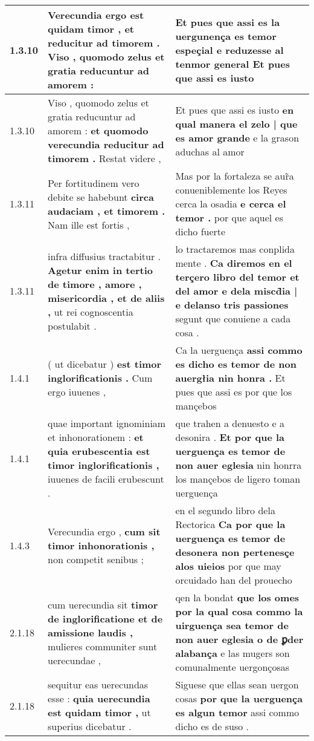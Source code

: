 \begin{tabular}{|p{1cm}|p{6.5cm}|p{6.5cm}|}
1.3.10 & Verecundia ergo est quidam timor , \textbf{ et reducitur ad timorem . } Viso , quomodo zelus et gratia reducuntur ad amorem : & Et pues que assi es la uergunença es temor espeçial \textbf{ e reduzesse al tenmor general } Et pues que assi es iusto \\\hline
1.3.10 & Viso , quomodo zelus et gratia reducuntur ad amorem : \textbf{ et quomodo verecundia reducitur ad timorem . } Restat videre , & Et pues que assi es iusto \textbf{ en qual manera el zelo | que es amor grande } e la grason aduchas al amor \\\hline
1.3.11 & Per fortitudinem vero debite se habebunt \textbf{ circa audaciam , et timorem . } Nam ille est fortis , & Mas por la fortaleza se aur̃a conueniblemente los Reyes cerca la osadia \textbf{ e cerca el temor . } por que aquel es dicho fuerte \\\hline
1.3.11 & infra diffusius tractabitur . \textbf{ Agetur enim in tertio de timore , amore , misericordia , et de aliis , } ut rei cognoscentia postulabit . & lo tractaremos mas conplida mente . \textbf{ Ca diremos en el terçero libro del temor et del amor e dela miscd̃ia | e delanso tris passiones } segunt que conuiene a cada cosa . \\\hline
1.4.1 & ( ut dicebatur ) \textbf{ est timor inglorificationis . } Cum ergo iuuenes , & Ca la uerguença \textbf{ assi commo es dicho es temor de non auergłia nin honra . } Et pues que assi es por que los mançebos \\\hline
1.4.1 & quae important ignominiam et inhonorationem : \textbf{ et quia erubescentia est timor inglorificationis , } iuuenes de facili erubescunt . & que trahen a denuesto e a desonira . \textbf{ Et por que la uerguença es temor de non auer eglesia } nin honrra los mançebos de ligero toman uerguença \\\hline
1.4.3 & Verecundia ergo , \textbf{ cum sit timor inhonorationis , } non competit senibus ; & en el segundo libro dela Rectorica \textbf{ Ca por que la uerguença es temor de desonera non pertenesçe alos uieios } por que may orcuidado han del prouecho \\\hline
2.1.18 & cum uerecundia sit \textbf{ timor de inglorificatione et de amissione laudis , } mulieres communiter sunt uerecundae , & qen la bondat \textbf{ que los omes por la qual cosa commo la uirguença sea temor de non auer eglesia o de ꝑder alabança } e las mugers son comunalmente uergonçosas \\\hline
2.1.18 & sequitur eas uerecundas esse : \textbf{ quia uerecundia est quidam timor , } ut superius dicebatur . & Siguese que ellas sean uergon cosas \textbf{ por que la uerguença es algun temor } assi commo dicho es de suso . \\\hline

\end{tabular}
